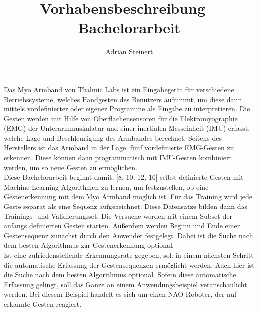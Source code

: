 \documentclass[]{scrartcl}
\title{Vorhabensbeschreibung -- Bachelorarbeit}
\author{Adrian Steinert}
\begin{document}
\maketitle

Das Myo Armband von Thalmic Labs ist ein Eingabegerät für verschiedene Betriebssysteme, welches Handgesten des Benutzers aufnimmt, um diese dann mittels vordefinierter oder eigener Programme als Eingabe zu interpretieren. Die Gesten werden mit Hilfe von Oberflächensensoren für die Elektromyographie (EMG) der Unterarmmuskulatur und einer inertialen Messeinheit (IMU) erfasst, welche Lage und Beschleunigung des Armbandes berechnet. Seitens des Herstellers ist das Armband in der Lage, fünf vordefinierte EMG-Gesten zu erkennen. Diese können dann programmatisch mit IMU-Gesten kombiniert werden, um so neue Gesten zu ermöglichen.\\

Diese Bachelorarbeit beginnt damit, [8, 10, 12, 16] selbst definierte Gesten mit Machine Learning Algorithmen zu lernen, um festzustellen, ob eine Gestenerkennung mit dem Myo Armband möglich ist. Für das Training wird jede Geste separat als eine Sequenz aufgezeichnet. Diese Datensätze bilden dann das Trainings- und Validierungsset. Die Versuche werden mit einem Subset der anfangs definierten Gesten starten. Außerdem werden Beginn und Ende einer Gestensequenz zunächst durch den Anwender festgelegt. Dabei ist die Suche nach dem besten Algorithmus zur Gestenerkennung optional.\\

Ist eine zufriedenstellende Erkennungsrate gegeben, soll in einem nächsten Schritt die automatische Erfassung der Gestensequenzen ermöglicht werden. Auch hier ist die Suche nach dem besten Algorithmus optional. Sofern diese automatische Erfassung gelingt, soll das Ganze an einem Anwendungsbeispiel veranschaulicht werden. Bei diesem Beispiel handelt es sich um einen NAO Roboter, der auf erkannte Gesten reagiert.
\end{document}
